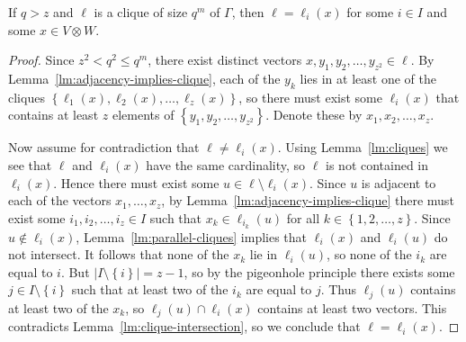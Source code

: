 \begin{lemma} \label{lm:no-other-cliques}
If $q > z$ and $\ell$ is a clique of size $q^m$ of $\Gamma$, then $\ell = \ell_i{\left(x \right)}$ for some $i \in I$ and some $x \in V \otimes W$.
\end{lemma}
\begin{proof}
Since $z^2 < q^2 \leqslant q^m$, there exist distinct vectors $x, y_1, y_2, \ldots, y_{z^2} \in \ell$. By Lemma~\ref{lm:adjacency-implies-clique}, each of the $y_k$ lies in at least one of the cliques $\left\{\ell_1{\left(x \right)}, \ell_2{\left(x \right)}, \ldots, \ell_z{\left(x \right)}\right\}$, so there must exist some $\ell_i{\left(x \right)}$ that contains at least $z$ elements of $\left\{y_1, y_2, \ldots, y_{z^2} \right\}$. Denote these by $x_1, x_2, \ldots, x_z$.

Now assume for contradiction that $\ell \neq \ell_i{\left(x \right)}$. Using Lemma~\ref{lm:cliques} we see that $\ell$ and $\ell_i{\left(x \right)}$ have the same cardinality, so $\ell$ is not contained in $\ell_i{\left(x \right)}$. Hence there must exist some $u \in \ell \setminus \ell_i{\left(x \right)}$. Since $u$ is adjacent to each of the vectors $x_1, \ldots, x_z$, by Lemma~\ref{lm:adjacency-implies-clique} there must exist some $i_1, i_2, \ldots, i_z \in I$ such that $x_k \in \ell_{i_k}{\left(u \right)}$ for all $k \in \left\{1, 2, \ldots, z \right\}$. Since $u \notin \ell_i{\left(x \right)}$, Lemma~\ref{lm:parallel-cliques} implies that $\ell_i{\left(x \right)}$ and $\ell_i{\left(u \right)}$ do not intersect. It follows that none of the $x_k$ lie in $\ell_i{\left(u \right)}$, so none of the $i_k$ are equal to $i$. But $\left|I \setminus \left\{i \right\}\right| = z-1$, so by the pigeonhole principle there exists some $j \in I \setminus \left\{i \right\}$ such that at least two of the $i_k$ are equal to $j$. Thus $\ell_j{\left(u \right)}$ contains at least two of the $x_k$, so $\ell_j{\left(u \right)} \cap \ell_i{\left(x \right)}$ contains at least two vectors. This contradicts Lemma~\ref{lm:clique-intersection}, so we conclude that $\ell = \ell_i{\left(x \right)}$.
\end{proof}

